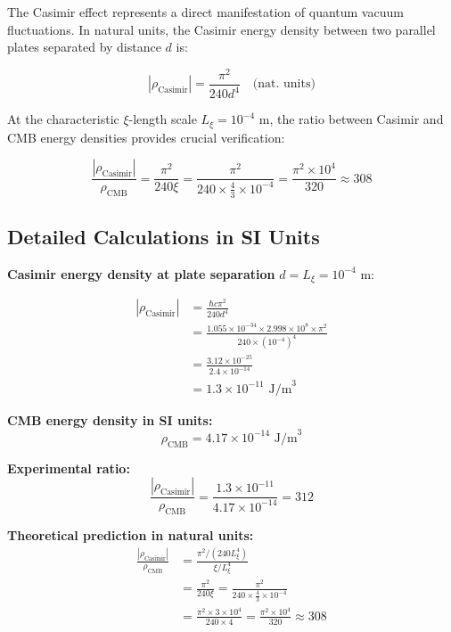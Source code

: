 	The Casimir effect represents a direct manifestation of quantum vacuum fluctuations. In natural units, the Casimir energy density between two parallel plates separated by distance $d$ is:
	
	\begin{equation}
		|\rho_{\text{Casimir}}| = \frac{\pi^2}{240 d^4} \quad \text{(nat. units)}
	\end{equation}
	
	At the characteristic $\xi$-length scale $L_\xi = 10^{-4}$ m, the ratio between Casimir and CMB energy densities provides crucial verification:
	
	\begin{equation}
		\frac{|\rho_{\text{Casimir}}|}{\rho_{\text{CMB}}} = \frac{\pi^2}{240 \xi} = \frac{\pi^2}{240 \times \frac{4}{3} \times 10^{-4}} = \frac{\pi^2 \times 10^4}{320} \approx 308
	\end{equation}
	
	\subsection{Detailed Calculations in SI Units}
	
	\textbf{Casimir energy density at plate separation} $d = L_\xi = 10^{-4}$ m:
	
	\begin{align}
		|\rho_{\text{Casimir}}| &= \frac{\hbar c \pi^2}{240 d^4} \\
		&= \frac{1.055 \times 10^{-34} \times 2.998 \times 10^8 \times \pi^2}{240 \times (10^{-4})^4} \\
		&= \frac{3.12 \times 10^{-25}}{2.4 \times 10^{-14}} \\
		&= 1.3 \times 10^{-11} \text{ J/m}^3
	\end{align}
	
	\textbf{CMB energy density in SI units:}
	\begin{equation}
		\rho_{\text{CMB}} = 4.17 \times 10^{-14} \text{ J/m}^3
	\end{equation}
	
	\textbf{Experimental ratio:}
	\begin{equation}
		\frac{|\rho_{\text{Casimir}}|}{\rho_{\text{CMB}}} = \frac{1.3 \times 10^{-11}}{4.17 \times 10^{-14}} = 312
	\end{equation}
	
	\textbf{Theoretical prediction in natural units:}
	\begin{align}
		\frac{|\rho_{\text{Casimir}}|}{\rho_{\text{CMB}}} &= \frac{\pi^2 / (240 L_\xi^4)}{\xi / L_\xi^4} \\
		&= \frac{\pi^2}{240 \xi} = \frac{\pi^2}{240 \times \frac{4}{3} \times 10^{-4}} \\
		&= \frac{\pi^2 \times 3 \times 10^4}{240 \times 4} = \frac{\pi^2 \times 10^4}{320} \approx 308
	\end{align}
	
